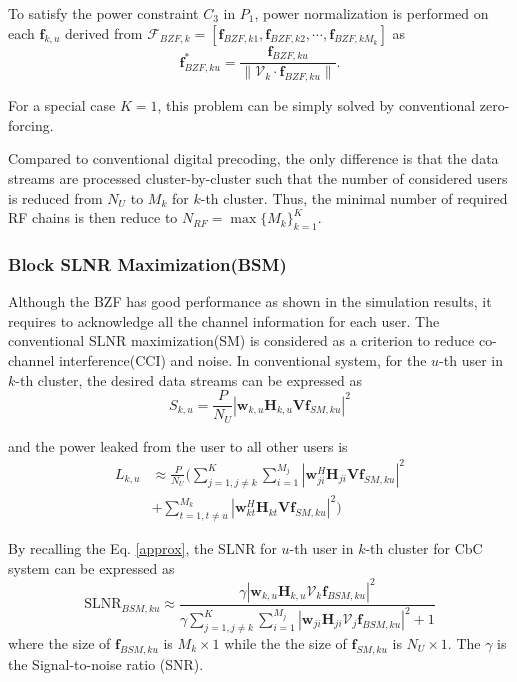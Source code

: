 \documentclass[conference]{IEEEtran}
\begin{document}
{To satisfy the power constraint $C_3$ in $P_1$, power normalization is performed on each ${\bm f}_{k,u}$ derived from $\bm{\mathcal{F}}_{BZF,k}=\left[\bm{f}_{BZF,k1},\bm{f}_{BZF,k2},\cdots,\bm{f}_{BZF,kM_k}\right]$ as
\begin{equation}\label{eq:ZFU-HBF2}
\bm{f}^*_{BZF,ku} = {\frac{\bm{f}_{BZF,ku}}{\|\bm{\mathcal{V}}_k\cdot\bm{f}_{BZF,ku}\|}}.
\end{equation}

For a special case $K=1$, this problem can be simply solved by conventional zero-forcing.

Compared to conventional digital precoding, the only difference is that the data streams are processed cluster-by-cluster such that the number of considered users is reduced from $N_U$ to $M_k$ for $k$-th cluster. Thus, the minimal number of required RF chains is then reduce to $N_{RF} = \max \{M_k\}_{k=1}^K$.


\subsubsection{Block SLNR Maximization(BSM)}
Although the BZF has good performance as shown in the simulation results, it requires to acknowledge all the channel information for each user.
The conventional SLNR maximization(SM) is considered as a criterion to reduce co-channel interference(CCI) and noise.  In conventional system, for the $u$-th user in $k$-th cluster, the desired data streams can be expressed as
\begin{equation}
	S_{k,u} = \frac{P}{N_U}|\bm{w}_{k,u} \bm{H}_{k,u} \bm{V} \bm{f}_{SM,ku}|^2
\end{equation}

and the power leaked from the user to all other users is
\begin{align}
L_{k,u} &\approx \frac{P}{N_U}(\sum_{j=1,j\neq k}^{K}\sum_{i=1}^{M_j}|\bm{w}_{ji}^H \bm{H}_{ji} \bm{V} \bm{f}_{SM,ku}|^2\nonumber\\
&+ \sum_{t=1,t\neq u}^{M_k}|\bm{w}_{kt}^H \bm{H}_{kt} \bm{V}\bm{f}_{SM,ku}|^2)
\end{align}

By recalling the Eq. \eqref{approx}, the SLNR for $u$-th user in $k$-th cluster for CbC system can be expressed as
\begin{equation}
	\text{SLNR}_{BSM, ku} \approx \frac{\gamma|\bm{w}_{k,u} \bm{H}_{k,u} \bm{\mathcal{V}}_k \bm{f}_{BSM,ku}|^2}{\gamma \sum_{j=1,j\neq k}^{K}\sum_{i=1}^{M_j}|\bm{w}_{ji} \bm{H}_{ji} \bm{\mathcal{V}}_j \bm{f}_{BSM,ku}|^2+1}
\end{equation}
where the size of $\bm{f}_{BSM,ku} $ is $M_k\times 1$ while the the size of $\bm{f}_{SM,ku}$ is $N_U \times 1$. The $\gamma$ is the Signal-to-noise ratio (SNR).

}
\end{document}
